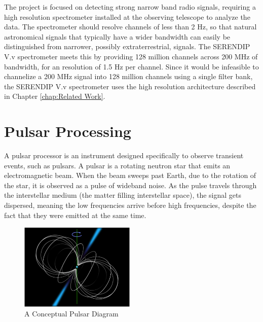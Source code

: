 The project is focused on detecting strong narrow band radio signals, requiring a high resolution spectrometer installed at the observing telescope to analyze the data. 
The spectrometer should resolve channels of less than 2 Hz, so that natural astronomical signals that typically have a wider bandwidth can easily be distinguished from narrower, possibly extraterrestrial, signals. 
The SERENDIP V.v spectrometer meets this by providing 128 million channels across 200 MHz of bandwidth, for an resolution of 1.5 Hz per channel. 
Since it would be infeasible to channelize a 200 MHz signal into 128 million channels using a single filter bank, the SERENDIP V.v spectrometer uses the high resolution architecture described in Chapter \ref{chap:Related Work}. %






\section{Pulsar Processing}
\label{Real Time Radio Astronomy Algorithms:Pulsar Processing}
A pulsar processor is an instrument designed specifically to observe transient events, such as pulsars. 
A pulsar is a rotating neutron star that emits an electromagnetic beam. 
When the beam sweeps past Earth, due to the rotation of the star, it is observed as a pulse of wideband noise. 
As the pulse travels through the interstellar medium (the matter filling interstellar space), the signal gets dispersed, meaning the low frequencies arrive before high frequencies, despite the fact that they were emitted at the same time. 

\begin{figure}
  \centering
    \includegraphics[width=0.49\textwidth]{Images/C2/pulsar.png}
  \caption{A Conceptual Pulsar Diagram}
  \label{fig: C2/pulsar.png}
\end{figure}

